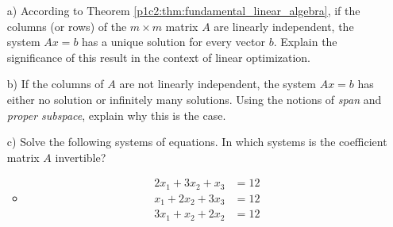 \begin{itemize}
	\item[a)] According to Theorem \ref{p1c2:thm:fundamental_linear_algebra}, if the columns (or rows) of the $m \times m$ matrix $A$ are linearly independent, the system $Ax=b$ has a unique solution for every vector $b$. Explain the significance of this result in the context of linear optimization.
	\item[b)] If the columns of $A$ are not linearly independent, the system $Ax = b$ has either no solution or infinitely many solutions. Using the notions of \emph{span} and \emph{proper subspace}, explain why this is the case. 
	\item[c)] Solve the following systems of equations. In which systems is the coefficient matrix $A$ invertible?
	\begin{itemize}
		\item \begin{align}
			2x_1 + 3x_2 + x_3 &= 12\\
			x_1 + 2x_2 + 3x_3 &= 12\\
			3x_1 + x_2 + 2x_2 &= 12
		\end{align}
	\end{itemize}
\end{itemize}
